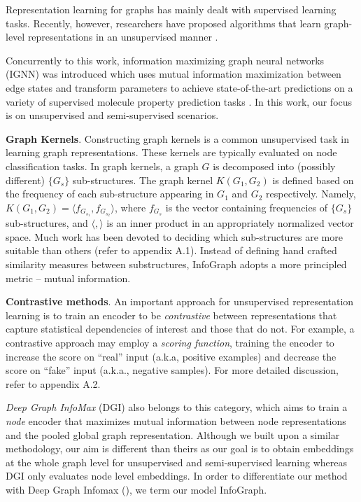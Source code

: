 \documentclass{article} \usepackage{iclr2020_conference,times}
\newcommand{\xhdr}[1]{{\noindent\bfseries #1}.}
\def\method{InfoGraph}
\begin{document}
Representation learning for graphs has mainly dealt with supervised learning tasks. Recently, however, researchers have proposed algorithms that learn graph-level representations in an unsupervised manner \cite{narayanan2017graph2vec,sub2vec}.

Concurrently to this work, information maximizing graph neural networks (IGNN) was introduced which uses mutual information maximization between edge states and transform parameters to achieve state-of-the-art predictions on a variety of supervised molecule property prediction tasks \cite{chen2019utilizing}. In this work, our focus is on unsupervised and semi-supervised scenarios. 

\xhdr{Graph Kernels}
Constructing graph kernels is a common unsupervised task in learning graph representations. These kernels are typically evaluated on node classification tasks. In graph kernels, a graph $G$ is decomposed into (possibly different) $\{G_{s}\}$ sub-structures. The graph kernel $K(G_1,G_2)$  is defined based on the frequency of each sub-structure appearing in $G_1$ and $G_2$ respectively. Namely, $K(G_1,G_2)=\langle f_{G_{s_1}},f_{G_{s_2}}\rangle$, where $f_{G_{s}}$ is the vector containing  frequencies of  $\{G_{s}\}$ sub-structures, and $\langle,\rangle$ is an inner product in an appropriately normalized vector space. Much work has been devoted to deciding which sub-structures are more suitable than others (refer to appendix A.1). Instead of defining hand crafted similarity measures between substructures, \method{} adopts a more principled metric -- mutual information.

\xhdr{Contrastive methods}
An important approach for unsupervised  representation learning  is to train an encoder to be \emph{contrastive} between representations that capture statistical dependencies of interest and those that do not. For example, a contrastive approach may employ a \emph{scoring function}, training the encoder to increase the score on ``real'' input (a.k.a, positive examples) and decrease the score on ``fake'' input (a.k.a., negative samples). For more detailed discussion, refer to appendix A.2.

\textit{Deep Graph InfoMax} (DGI) \cite{velivckovic2018deep} also belongs to this category, which aims to train a \emph{node} encoder that maximizes mutual information between node representations and the pooled global graph representation. Although we built upon a similar methodology, our aim is different than theirs as our goal is to obtain embeddings at the whole graph level for unsupervised and semi-supervised learning whereas DGI only evaluates node level embeddings. In order to differentiate our method with Deep Graph Infomax (\cite{velivckovic2018deep}), we term our model \method{}.
\end{document}
